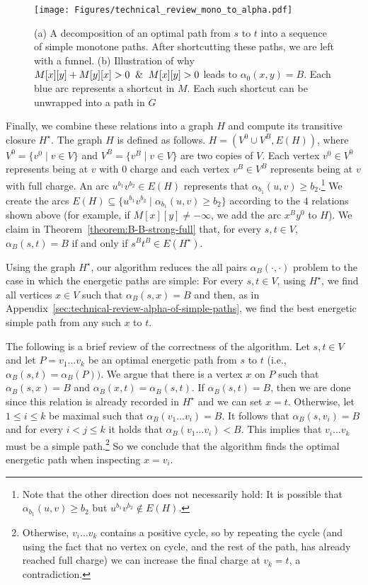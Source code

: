 \documentclass[11pt]{article}
\begin{document}
\begin{figure}
    \centering
    \texttt{[image: Figures/technical\_review\_mono\_to\_alpha.pdf]}
    \caption{(a) A decomposition of an optimal path from $s$ to $t$ into a sequence of simple monotone paths. After shortcutting these paths, we are left with a funnel. (b) Illustration of why $M[x][y]+M[y][x]>0 \And M[x][y] >0$ leads to $\alpha_0(x,y)=B$. Each blue arc represents a shortcut in $M$. Each such shortcut can be unwrapped into a path in $G$}
    \label{fig:mono-to-alpha-derivation}
\end{figure}

Finally, we combine  these relations into a graph $H$ and compute its transitive closure $H^\star$. 
The graph $H$ is defined as follows. $H = (V^0 \cup V^B, E(H))$, where
$V^0 = \{v^0 \mid v\in V \}$
and 
$V^B = \{v^B \mid v\in V \}$
are two copies of $V$. Each vertex
$v^0\in V^0$ represents being at $v$ with $0$ charge and each vertex $v^B\in V^B$ represents being at $v$ with full charge.
  An arc $u^{b_1} v^{b_2}\in E(H)$ represents that $\alpha_{b_1}(u,v) \ge b_2$.\footnote{Note that the other direction does not necessarily hold: It is possible that $\alpha_{b_1}(u,v) \ge b_2$ but $u^{b_1} v^{b_2}\notin E(H)$.} We create the arcs $E(H) \subseteq \{u^{b_1} v^{b_2} \mid  \alpha_{b_1}(u,v) \ge b_2\}$ according to the $4$ relations shown above (for example, if $M[x][y]\neq -\infty$, we add the arc $x^B y^0$ to $H$).
 We claim in Theorem~\ref{theorem:B-B-strong-full} that, for every $s,t\in V$, $\alpha_B(s,t)=B$ if and only if $s^B t^B \in E(H^\star)$.


Using the graph $H^\star$, our  algorithm reduces the all pairs $\alpha_B(\cdot,\cdot)$ problem to the case in which the energetic paths are simple: For every $s,t \in V$, using $H^\star$, we find all vertices $x\in V$ such that $\alpha_B(s,x)=B$ and then, as in Appendix~\ref{sec:technical-review-alpha-of-simple-paths}, we find the best energetic simple path from 
any such $x$ to $t$. 

The following is a brief review of the correctness of the algorithm. Let $s,t\in V$ and let $P = v_1\ldots v_k$ be an optimal energetic path from $s$ to $t$ (i.e., $\alpha_B(s,t) = \alpha_B(P))$.
We argue that there is a vertex $x$ on $P$
such that $\alpha_B(s,x) = B$ and $\alpha_B(x,t) = \alpha_B(s,t)$.
If $\alpha_B(s,t)=B$, then we are done since this relation is already recorded in $H^\star$ and we can set $x=t$. Otherwise, let $1\le i\le k$ be maximal such that $\alpha_B(v_1\ldots v_i) = B$. It follows that $\alpha_B(s,v_i)=B$ and for every $i< j \le k$ it holds that $\alpha_B(v_1\ldots v_i) < B$. This implies that $v_i \ldots v_k$ must be a simple path.\footnote{Otherwise, $v_i \ldots v_k$ contains a positive cycle, so by repeating the cycle (and using the fact that no vertex on cycle, and the rest of the path, has already reached full charge) we can increase the final charge at $v_k=t$, a contradiction.} So we conclude that  the algorithm  finds the optimal energetic path when inspecting $x = v_i$.
\end{document}
